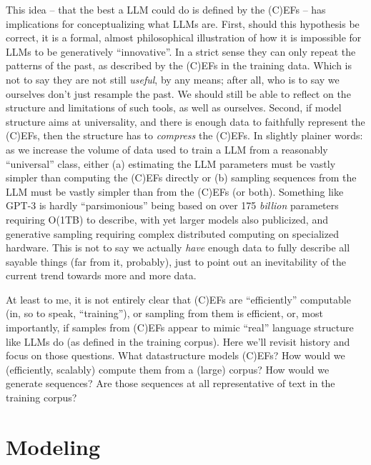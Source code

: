 \documentclass[11pt, oneside]{amsart}   	%
\begin{document}
This idea -- that the best a LLM could do is defined by the (C)EFs -- has implications for conceptualizing what LLMs are. First, should this hypothesis be correct, it is a formal, almost philosophical illustration of how it is impossible for LLMs to be generatively ``innovative''. In a strict sense they can only repeat the patterns of the past, as described by the (C)EFs in the training data. Which is not to say they are not still {\em useful}, by any means; after all, who is to say we ourselves don't just resample the past. We should still be able to reflect on the structure and limitations of such tools, as well as ourselves. Second, if model structure aims at universality, and there is enough data to faithfully represent the (C)EFs, then the structure has to {\em compress} the (C)EFs. In slightly plainer words: as we increase the volume of data used to train a LLM from a reasonably ``universal''  class, either (a) estimating the LLM parameters must be vastly simpler than computing the (C)EFs directly or (b) sampling sequences from the LLM must be vastly simpler than from the (C)EFs (or both). Something like GPT-3 is hardly ``parsimonious'' being based on over 175 {\em billion} parameters requiring O(1TB) to describe, with yet larger models also publicized, and generative sampling requiring complex distributed computing on specialized hardware. This is not to say we actually {\em have} enough data to fully describe all sayable things (far from it, probably), just to point out an inevitability of the current trend towards more and more data. 

At least to me, it is not entirely clear that (C)EFs are ``efficiently'' computable (in, so to speak, ``training''), or sampling from them is efficient, or, most importantly, if samples from (C)EFs appear to mimic ``real'' language structure like LLMs do (as defined in the training corpus). Here we'll revisit history and focus on those questions. What datastructure models (C)EFs? How would we (efficiently, scalably) compute them from a (large) corpus? How would we generate sequences? Are those sequences at all representative of text in the training corpus?

\section{Modeling}
\end{document}
